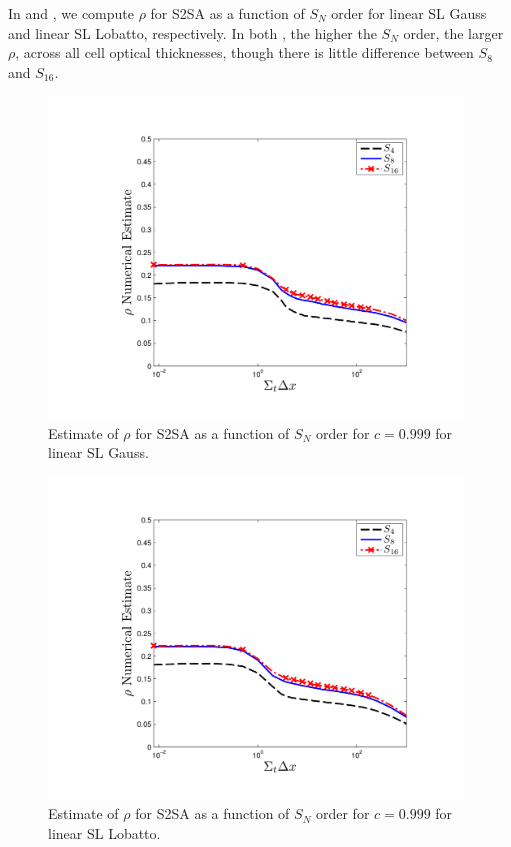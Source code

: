 In  and , we compute $\rho$ for S2SA as a function of $S_N$ order for linear SL Gauss and linear SL Lobatto, respectively.  In both , the higher the $S_N$ order, the larger $\rho$, across all cell optical thicknesses, though there is little difference between $S_8$ and $S_{16}$.
\begin{figure}[!hbp]
\centering
\includegraphics[width=11cm]{chapter4_acceleration/Constant_XS_sn_comparions_S2SA_Gauss.pdf}
\caption{Estimate of $\rho$ for S2SA as a function of $S_N$ order for $c=0.999$ for  linear SL Gauss.}
\label{fig:s2sa_gauss_as_fun_sn}
\end{figure}
%
%
\begin{figure}[!htp]
\centering
\includegraphics[width=11cm]{chapter4_acceleration/Constant_XS_sn_comparions_S2SA_Lobatto.pdf}
\caption{Estimate of $\rho$ for S2SA as a function of $S_N$ order for $c=0.999$ for  linear SL Lobatto.}
\label{fig:s2sa_lobatto_as_fun_sn}
\end{figure}
